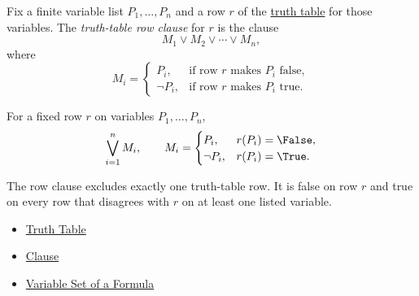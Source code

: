 \begin{tcolorbox}[colback=propbox, colframe=propborder, arc=2pt, left=6pt, right=6pt, top=4pt, bottom=4pt, title={\small\textbf{Definition (Truth-Table Row Clause)}}]
\begin{definition}
\label{def:truth-table-row-clause-propositional-logic}
Fix a finite variable list \(P_1,\ldots,P_n\) and a row \(r\) of the
\hyperref[def:truth-table-propositional-logic]{truth table} for those
variables. The \emph{truth-table row clause} for \(r\) is the clause
\[
M_1\lor M_2\lor\cdots\lor M_n,
\]
where
\[
M_i=
\begin{cases}
P_i, & \text{if row }r\text{ makes }P_i\text{ false},\\
\neg P_i, & \text{if row }r\text{ makes }P_i\text{ true}.
\end{cases}
\]
\end{definition}
\end{tcolorbox}

\begin{remark*}
For a fixed row \(r\) on variables \(P_1,\ldots,P_n\),
\[
\bigvee_{i=1}^{n} M_i,
\qquad
M_i=
\begin{cases}
P_i, & r(P_i)=\False,\\
\neg P_i, & r(P_i)=\True.
\end{cases}
\]
\end{remark*}

\begin{remark*}[Interpretation]
The row clause excludes exactly one truth-table row. It is false on row \(r\)
and true on every row that disagrees with \(r\) on at least one listed
variable.
\end{remark*}

\begin{dependencies}
\begin{itemize}
  \item \hyperref[def:truth-table-propositional-logic]{Truth Table}
  \item \hyperref[def:clause-propositional-logic]{Clause}
  \item \hyperref[def:formula-variable-set-propositional-logic]{Variable Set of a Formula}
\end{itemize}
\end{dependencies}

